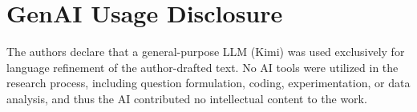 \documentclass[sigconf]{acmart}
\begin{document}
\section*{GenAI Usage Disclosure}
The authors declare that a general-purpose LLM (Kimi) was used exclusively for language refinement of the author-drafted text. No AI tools were utilized in the research process, including question formulation, coding, experimentation, or data analysis, and thus the AI contributed no intellectual content to the work.




\end{document}
